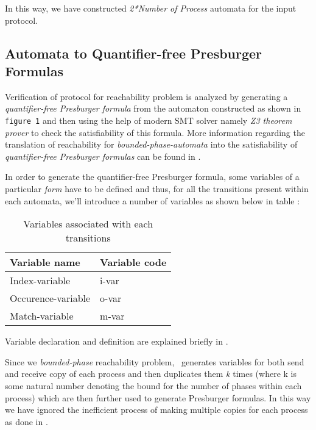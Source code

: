In this way, we have constructed \emph{2*Number of Process} automata for the input protocol.


\subsection{Automata to Quantifier-free Presburger Formulas}
Verification of protocol for reachability problem is analyzed by generating a  \emph{quantifier-free Presburger formula} from the automaton 
constructed as shown in {\tt figure 1} and then using the help of modern SMT solver namely \emph{Z3 theorem prover} to check the satisfiability of this formula. 
More information  regarding the  translation of reachability for \emph{bounded-phase-automata} 
into the satisfiability of \emph{quantifier-free Presburger formulas} can be found in \cite{AAC13}.


In order to generate the quantifier-free Presburger formula,  some variables of a particular \emph{form} have to be 
defined and thus, for all the transitions present within each automata, we'll introduce a number of variables as shown below in table :
\begin{table}[ht]
  \begin{center}
    \begin{tabular}{|l|l|}
      \hline
      Variable name & Variable code\\
      \hline
      Index-variable & i-var\\
      Occurence-variable & o-var\\
      Match-variable & m-var\\
      \hline
    \end{tabular}
  \end{center}
  \caption{Variables associated with each transitions}\label{tbl:variables}
\end{table}


Variable declaration and definition are explained briefly in \cite{AAC13}.


Since we  \emph{bounded-phase} reachability problem, \MPass\ generates variables for both send and receive copy of 
each process and then duplicates them \emph{k} times (where k is some natural number denoting the bound for the number of phases within each process) which are then further used to generate Presburger formulas. In this way we have ignored the inefficient process of making 
multiple copies for each process as done in \cite{AAC13}.

